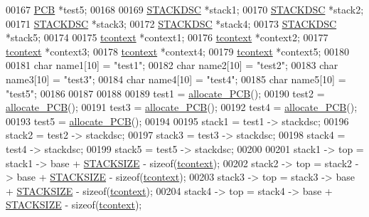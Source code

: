 \begin{DoxyCode}
00167         \hyperlink{structprocess}{PCB} *test5;
00168         
00169         \hyperlink{structstack}{STACKDSC} *stack1;
00170         \hyperlink{structstack}{STACKDSC} *stack2;
00171         \hyperlink{structstack}{STACKDSC} *stack3;
00172         \hyperlink{structstack}{STACKDSC} *stack4;
00173         \hyperlink{structstack}{STACKDSC} *stack5;
00174         
00175         \hyperlink{structcontext}{tcontext} *context1;
00176         \hyperlink{structcontext}{tcontext} *context2;
00177         \hyperlink{structcontext}{tcontext} *context3;
00178         \hyperlink{structcontext}{tcontext} *context4;
00179         \hyperlink{structcontext}{tcontext} *context5;
00180         
00181         \textcolor{keywordtype}{char} name1[10] = \textcolor{stringliteral}{"test1"};
00182         \textcolor{keywordtype}{char} name2[10] = \textcolor{stringliteral}{"test2"};
00183         \textcolor{keywordtype}{char} name3[10] = \textcolor{stringliteral}{"test3"};
00184         \textcolor{keywordtype}{char} name4[10] = \textcolor{stringliteral}{"test4"};
00185         \textcolor{keywordtype}{char} name5[10] = \textcolor{stringliteral}{"test5"};
00186         
00187         
00188         
00189         test1 = \hyperlink{mpx__r2_8c_a58a8a1ea0a96b9ecf0be29179a5a0a1e}{allocate_PCB}();
00190         test2 = \hyperlink{mpx__r2_8c_a58a8a1ea0a96b9ecf0be29179a5a0a1e}{allocate_PCB}();
00191         test3 = \hyperlink{mpx__r2_8c_a58a8a1ea0a96b9ecf0be29179a5a0a1e}{allocate_PCB}();
00192         test4 = \hyperlink{mpx__r2_8c_a58a8a1ea0a96b9ecf0be29179a5a0a1e}{allocate_PCB}();
00193         test5 = \hyperlink{mpx__r2_8c_a58a8a1ea0a96b9ecf0be29179a5a0a1e}{allocate_PCB}();
00194         
00195         stack1 = test1 -> stackdsc;
00196         stack2 = test2 -> stackdsc;
00197         stack3 = test3 -> stackdsc;
00198         stack4 = test4 -> stackdsc;
00199         stack5 = test5 -> stackdsc;
00200         
00201         stack1 -> top = stack1 -> base + \hyperlink{mpx__r2_8h_a21d9543c516fffee84a7963224271f95}{STACKSIZE} - \textcolor{keyword}{sizeof}(\hyperlink{structcontext}{tcontext});
00202         stack2 -> top = stack2 -> base + \hyperlink{mpx__r2_8h_a21d9543c516fffee84a7963224271f95}{STACKSIZE} - \textcolor{keyword}{sizeof}(\hyperlink{structcontext}{tcontext});
00203         stack3 -> top = stack3 -> base + \hyperlink{mpx__r2_8h_a21d9543c516fffee84a7963224271f95}{STACKSIZE} - \textcolor{keyword}{sizeof}(\hyperlink{structcontext}{tcontext});
00204         stack4 -> top = stack4 -> base + \hyperlink{mpx__r2_8h_a21d9543c516fffee84a7963224271f95}{STACKSIZE} - \textcolor{keyword}{sizeof}(\hyperlink{structcontext}{tcontext});

\end{DoxyCode}

